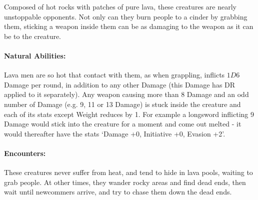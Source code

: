\label{lavaman}

\lavaman

Composed of hot rocks with patches of pure lava, these creatures are nearly unstoppable opponents.  Not only can they burn people to a cinder by grabbing them, sticking a weapon inside them can be as damaging to the weapon as it can be to the creature.

\paragraph{Natural Abilities:} Lava men are so hot that contact with them, as when grappling, inflicts $1D6$ Damage per round, in addition to any other Damage (this Damage has DR applied to it separately).  Any weapon causing more than 8 Damage and an odd number of Damage (e.g. 9, 11 or 13 Damage) is stuck inside the creature and each of its stats except Weight reduces by 1.  For example a longsword inflicting 9 Damage would stick into the creature for a moment and come out melted - it would thereafter have the stats `Damage +0, Initiative +0, Evasion +2'.

\paragraph{Encounters:} These creatures never suffer from heat, and tend to hide in lava pools, waiting to grab people.  At other times, they wander rocky areas and find dead ends, then wait until newcommers arrive, and try to chase them down the dead ends.

